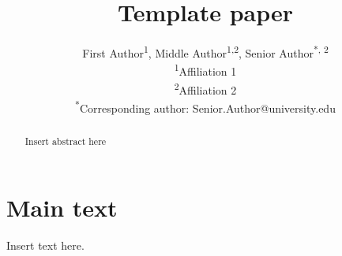 \documentclass[10pt]{article}
\title{Template paper}
\author{First Author\textsuperscript{1}, Middle Author\textsuperscript{1,2}, Senior Author\textsuperscript{*, 2}\\\textsuperscript{1}Affiliation 1\\\textsuperscript{2}Affiliation 2\\\textsuperscript{*}Corresponding author: Senior.Author@university.edu}
\date{}
\begin{document}
\maketitle

\begin{abstract}
Insert abstract here
\end{abstract}


\section*{Main text}
Insert text here.



\end{document}
